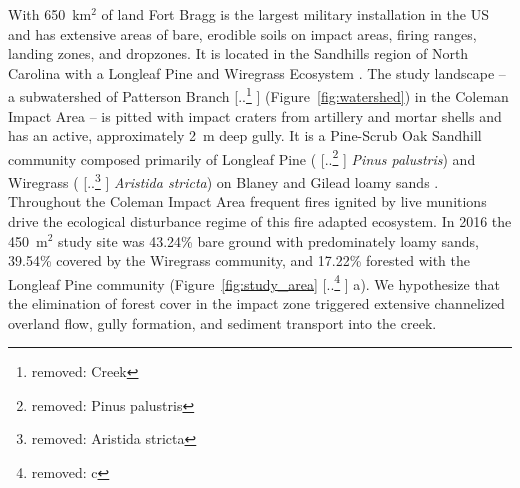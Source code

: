 \documentclass[gmd, manuscript]{copernicus}
\providecommand{\DIFadd}[1]{{\protect\color{blue} \sf #1}} %
\providecommand{\DIFdel}[1]{{\protect\color{red} [..\footnote{removed: #1} ]}} %
\providecommand{\DIFaddbegin}{} %
\providecommand{\DIFaddend}{} %
\providecommand{\DIFdelbegin}{} %
\providecommand{\DIFdelend}{} %
\begin{document}
With 650~\unit{km}$^{2}$ of land
Fort Bragg is the largest military installation in the US
and has extensive areas of bare, erodible soils
on impact areas, firing ranges, landing zones, and dropzones. 
It is located in the Sandhills region of North Carolina 
with a Longleaf Pine and Wiregrass Ecosystem \citep{Sorrie2006}.
%
The study landscape 
-- a subwatershed of Patterson Branch \DIFdelbegin \DIFdel{Creek 
}\DIFdelend \DIFaddbegin \DIFadd{(Figure~\ref{fig:watershed}) 
}\DIFaddend in the Coleman Impact Area --
is pitted with impact craters from artillery and mortar shells
and has an active, approximately 2~\unit{m} deep gully. 
%
It is a Pine-Scrub Oak Sandhill community
composed primarily of Longleaf Pine (\DIFdelbegin \DIFdel{Pinus palustris}\DIFdelend \DIFaddbegin \DIFadd{\emph{Pinus palustris}}\DIFaddend )
and Wiregrass (\DIFdelbegin \DIFdel{Aristida stricta}\DIFdelend \DIFaddbegin \DIFadd{\emph{Aristida stricta}}\DIFaddend )
on Blaney and Gilead loamy sands 
\citep{Sorrie2004}. 
%
Throughout the Coleman Impact Area
frequent fires ignited by live munitions
drive the ecological disturbance regime
of this fire adapted ecosystem.
%
In 2016 the  450~\unit{m}$^{2}$ study site was
43.24\% bare ground with predominately loamy sands,
39.54\% covered by the Wiregrass community, and
17.22\% forested with the Longleaf Pine community 
(Figure~\ref{fig:study_area}\DIFdelbegin \DIFdel{c}\DIFdelend \DIFaddbegin \DIFadd{a}\DIFaddend ). 
%
We hypothesize that the elimination of forest cover
in the impact zone
triggered extensive channelized overland flow,
gully formation, and sediment transport into the creek. 
\end{document}
